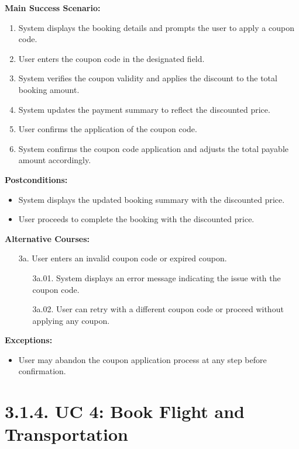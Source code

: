 \documentclass{scrreprt}
\begin{document}
\textbf{Main Success Scenario:}
\begin{enumerate}
    \item System displays the booking details and prompts the user to apply a coupon code.
    \item User enters the coupon code in the designated field.
    \item System verifies the coupon validity and applies the discount to the total booking amount.
    \item System updates the payment summary to reflect the discounted price.
    \item User confirms the application of the coupon code.
    \item System confirms the coupon code application and adjusts the total payable amount accordingly.
\end{enumerate}

\textbf{Postconditions:}
\begin{itemize}
    \item System displays the updated booking summary with the discounted price.
    \item User proceeds to complete the booking with the discounted price.
\end{itemize}

\textbf{Alternative Courses:}
\begin{itemize}
    \item[3a.] User enters an invalid coupon code or expired coupon.
    \begin{itemize}
        \item[3a.01.] System displays an error message indicating the issue with the coupon code.
        \item[3a.02.] User can retry with a different coupon code or proceed without applying any coupon.
    \end{itemize}
\end{itemize}

\textbf{Exceptions:}
\begin{itemize}
    \item User may abandon the coupon application process at any step before confirmation.
\end{itemize}


\section*{\textbf{3.1.4. UC 4: Book Flight and Transportation}}
\end{document}
